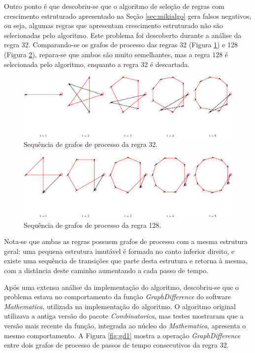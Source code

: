 \documentclass[12pt,a4paper]{article}
\begin{document}
Outro ponto é que descobriu-se que o algoritmo de seleção de regras com
crescimento estruturado apresentado na Seção \ref{sec:mikialgo} gera falsos
negativos, ou seja, algumas regras que apresentam crescimento estruturado
não são selecionadas pelo algoritmo. Este problema foi descoberto durante
a análise da regra 32. Comparando-se os grafos de processo das regras
32 (Figura \ref{fig:r32t}) e 128 (Figura \ref{fig:r128t}), repara-se que
ambos são muito semelhantes, mas a regra 128 é selecionada pelo algoritmo,
enquanto a regra 32 é descartada.

\begin{figure}[htp]
\begin{center}
\includegraphics[scale=0.55]{img/Rule32.eps}
\caption{Sequência de grafos de processo da regra 32.}
\label{fig:r32t}
\end{center}
\end{figure}

\begin{figure}[htp]
\begin{center}
\includegraphics[scale=0.55]{img/Rule128.eps}
\caption{Sequência de grafos de processo da regra 128.}
\label{fig:r128t}
\end{center}
\end{figure}

Nota-se que ambas as regras possuem grafos de processo com a mesma estrutura geral:
uma pequena estrutura imutável é formada no canto inferior direito, e existe
uma sequência de transições que parte desta estrutura e retorna à mesma, com
a distância deste caminho aumentando a cada passo de tempo.

Após uma extensa análise da implementação do algoritmo, descobriu-se que o
problema estava no comportamento da função \textit{GraphDifference} do
software \textit{Mathematica}, utilizada na implementação do algoritmo.
O algoritmo original utilizava a antiga versão do pacote
\textit{Combinatorica}, mas testes mostraram que a versão mais recente da
função, integrada ao núcleo do \textit{Mathematica}, apresenta o mesmo
comportamento. A Figura \ref{fig:gd1} mostra a operação
\textit{GraphDifference} entre dois grafos de processo de passos de tempo
consecutivos da regra 32.
\end{document}
